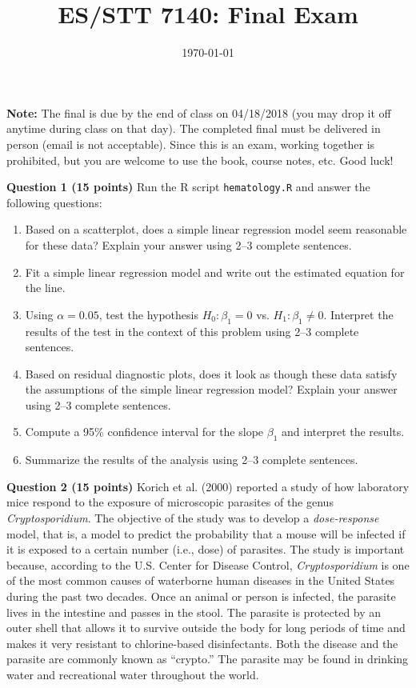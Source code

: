 \documentclass[12pt,a4paper]{article}\usepackage[]{graphicx}\usepackage[]{color}
\begin{document}
\title{ES/STT 7140: Final Exam}
\date{\today}
\maketitle

\textbf{Note:} The final is due by the end of class on 04/18/2018 (you may drop it off anytime during class on that day). The completed final must be delivered in person (email is not acceptable). Since this is an exam, working together is prohibited, but you are welcome to use the book, course notes, etc. Good luck!

\noindent\textbf{Question 1 (15 points)} Run the R script \texttt{hematology.R} and answer the following questions:

\begin{enumerate}
  \item Based on a scatterplot, does a simple linear regression model seem reasonable for these data? Explain your answer using 2--3 complete sentences.
  \item Fit a simple linear regression model and write out the estimated equation for the line.
  \item Using $\alpha = 0.05$, test the hypothesis $H_0: \beta_1 = 0$ vs. $H_1: \beta_1 \ne 0$. Interpret the results of the test in the context of this problem using 2--3 complete sentences.
  \item Based on residual diagnostic plots, does it look as though these data satisfy the assumptions of the simple linear regression model? Explain your answer using 2--3 complete sentences.
  \item Compute a 95\% confidence interval for the slope $\beta_1$ and interpret the results.
  \item Summarize the results of the analysis using 2--3 complete sentences.
\end{enumerate}


\newpage

\noindent\textbf{Question 2 (15 points)} Korich et al. (2000) reported a study of how laboratory mice respond to the exposure of microscopic parasites of the genus \textit{Cryptosporidium}. The objective of the study was to develop a \textit{dose-response} model, that is, a model to predict the probability that a mouse will be infected if it is exposed to a certain number (i.e., dose) of parasites. The study is important because, according to the U.S. Center for Disease Control, \textit{Cryptosporidium} is one of the most common causes of waterborne human diseases in the United States  during the past two decades. Once  an animal or person is infected, the parasite lives in the intestine and passes in the stool. The parasite is protected by an outer shell that allows it to survive outside the body for long periods of time and makes it very resistant to chlorine-based disinfectants. Both the disease and the parasite are commonly known as ``crypto.'' The parasite may be found in drinking water and recreational water throughout the world.
\end{document}

